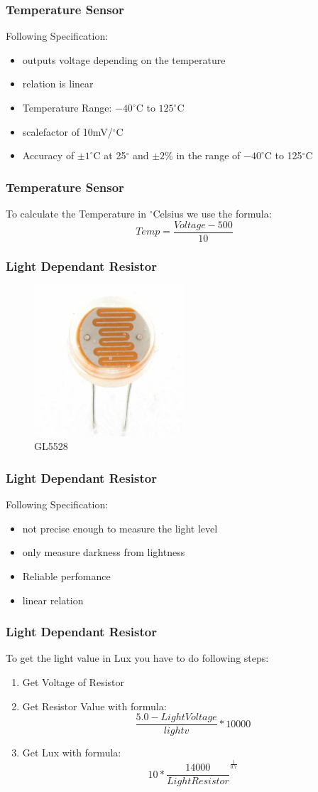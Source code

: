\documentclass{beamer}
\begin{document}
\frame
{
	\frametitle{Temperature Sensor}
	Following Specification:
	\begin{itemize}
	\item outputs voltage depending on the temperature
	\item relation is linear
	\item Temperature Range: $-40^{\circ}$C to $125^{\circ}$C
	\item scalefactor of 10mV/$^{\circ}$C
	\item Accuracy of $\pm1^{\circ}$C at 25$^{\circ}$ and $\pm2\%$ in the range of $-40^{\circ}$C to 125$^{\circ}$C
	\end{itemize}
}

\frame
{
	\frametitle{Temperature Sensor}
	To calculate the Temperature in $^{\circ}$Celsius we use the formula:\\
	\begin{equation*}
	Temp = \frac{Voltage - 500}{10} 
	\end{equation*}
}

\frame
{
	\frametitle{Light Dependant Resistor}
		\begin{figure}[h!]
  		\centering
    	\includegraphics[width=0.5\textwidth]{../Images/Light.jpg}
		\caption{GL5528}
	\end{figure}
}

\frame
{
	\frametitle{Light Dependant Resistor}
	Following Specification:
	\begin{itemize}
	\item not precise enough to measure the light level
	\item only measure darkness from lightness
	\item Reliable perfomance
	\item linear relation
	\end{itemize}
}

\frame
{
	\frametitle{Light Dependant Resistor}
	To get the light value in Lux you have to do following steps:
	\begin{enumerate}
	\item Get Voltage of Resistor
	\item Get Resistor Value with formula:
	\begin{equation*}
		\frac{5.0 - Light Voltage}{lightv} * 10000
	\end{equation*}
	\item Get Lux with formula:
	\begin{equation*}
		10*\frac{14000}{Light Resistor}^\frac{1}{0.7}
	\end{equation*}
	\end{enumerate}
}
\end{document}
